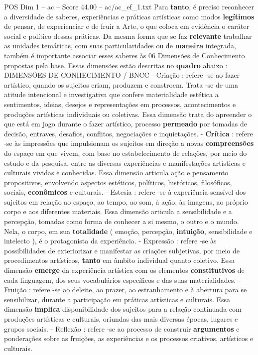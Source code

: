 \begin{textsample}{POS Dim 1 – ac – Score 44.00 – ac/ac\_ef\_1.txt}
Para \textbf{tanto}, é preciso reconhecer a diversidade de saberes, experiências e práticas artísticas como modos \textbf{legítimos} de pensar, de experienciar e de fruir a Arte, o que coloca em evidência o caráter social e político dessas práticas.
Da mesma forma que se faz \textbf{relevante} trabalhar as unidades temáticas, com suas particularidades ou de \textbf{maneira} integrada, também é importante associar esses saberes às 06 Dimensões de Conhecimento propostas pela base.
Essas dimensões estão descritas no \textbf{quadro} abaixo : DIMENSÕES DE CONHECIMENTO / BNCC - Criação : refere -se ao fazer artístico, quando os sujeitos criam, produzem e constroem.
Trata -se de uma atitude intencional e investigativa que confere materialidade estética a sentimentos, ideias, desejos e representações em processos, acontecimentos e produções artísticas individuais ou coletivas.
Essa dimensão trata do apreender o que está em jogo durante o fazer artístico, processo \textbf{permeado} por tomadas de decisão, entraves, desafios, conflitos, negociações e inquietações. - \textbf{Crítica} : refere -se às impressões que impulsionam os sujeitos em direção a novas \textbf{compreensões} do espaço em que vivem, com base no estabelecimento de relações, por meio do estudo e da pesquisa, entre as diversas experiências e manifestações artísticas e culturais vividas e conhecidas.
Essa dimensão articula ação e pensamento propositivos, envolvendo aspectos estéticos, políticos, históricos, filosóficos, sociais, \textbf{econômicos} e culturais. - Estesia : refere -se à experiência sensível dos sujeitos em relação ao espaço, ao tempo, ao som, à ação, às imagens, ao próprio corpo e aos diferentes materiais.
Essa dimensão articula a sensibilidade e a percepção, tomadas como forma de conhecer a si mesmo, o outro e o mundo.
Nela, o corpo, em sua \textbf{totalidade} ( emoção, percepção, \textbf{intuição}, sensibilidade e intelecto ), é o protagonista da experiência. - Expressão : refere -se às possibilidades de exteriorizar e manifestar as criações subjetivas, por meio de procedimentos artísticos, \textbf{tanto} em âmbito individual quanto coletivo.
Essa dimensão \textbf{emerge} da experiência artística com os elementos \textbf{constitutivos} de cada linguagem, dos seus vocabulários específicos e das suas materialidades. - Fruição : refere -se ao deleite, ao prazer, ao estranhamento e à abertura para se sensibilizar, durante a participação em práticas artísticas e culturais.
Essa dimensão \textbf{implica} disponibilidade dos sujeitos para a relação continuada com produções artísticas e culturais, oriundas das mais diversas épocas, lugares e grupos sociais. - Reflexão : refere -se ao processo de construir \textbf{argumentos} e ponderações sobre as fruições, as experiências e os processos criativos, artísticos e culturais.

\end{textsample}
